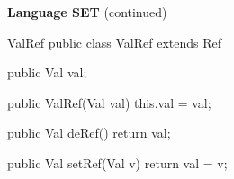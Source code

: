 \begin{minipage}[t]{\sw}
\slidenumber
\LARGE
{\bf Language SET} (continued)
\begin{qv}
ValRef
public class ValRef extends Ref {

    public Val val;

    public ValRef(Val val) {
        this.val = val;
    }

    public Val deRef() {
        return val;
    }

    public Val setRef(Val v) {
        return val = v;
    }
}
\end{qv}
\end{minipage}
